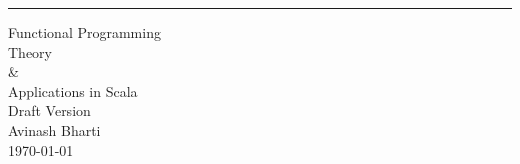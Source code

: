\begin{titlepage}
\raggedright

\begin{flushright}
    \rule{16cm}{5pt}\vskip1cm
    \begin{bfseries}
        \Huge{Functional Programming \\ Theory \\ \& \\ Applications in Scala  }\\
        \vspace{1.9cm}
        \small{Draft Version }\\
        \vspace{1.9cm}
       \small{ Avinash Bharti }\\
        \vspace{1.9cm}
        \today\\
    \end{bfseries}
\end{flushright}
\end{titlepage}
